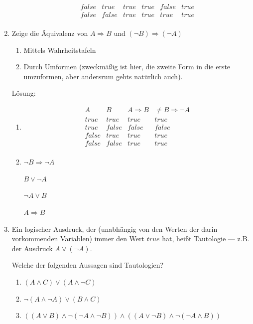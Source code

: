 \documentclass[../main.tex]{subfiles}
\begin{document}
\begin{enumerate}
\begin{enumerate}
\[\begin{array}{cccccc}
				            false & true  & true             & true   & false  & true               \\
				            false & false & true             & true   & true   & true               \\
			            \end{array}
		            \]
	      \end{enumerate}
	\item Zeige die Äquivalenz von \( A \Rightarrow B \) und \( (\neg B) \Rightarrow (\neg A) \)
	      \begin{enumerate}
		      \item Mittels Wahrheitstafeln
		      \item Durch Umformen (zweckmäßig ist hier, die zweite Form in die erste umzuformen,
		            aber andersrum gehts natürlich auch).
	      \end{enumerate}

	      Lösung:
	      \begin{enumerate}
		      \item \[
			            \begin{array}{cccc}
				            A     & B     & A \Rightarrow B & \neq B \Rightarrow \neg A \\
				            \hline
				            true  & true  & true            & true                      \\
				            true  & false & false           & false                     \\
				            false & true  & true            & true                      \\
				            false & false & true            & true                      \\
			            \end{array}
		            \]
		      \item \( \neg B \Rightarrow \neg A  \)

		            \( B \lor \neg A  \)

		            \( \neg A \lor B \)

		            \( A \Rightarrow B \)
	      \end{enumerate}
	\item Ein logischer Ausdruck, der (unabhängig von den Werten der darin vorkommenden Variablen)
	      immer den Wert \( true \) hat, heißt Tautologie — z.B. der Ausdruck \( A \lor (\neg A) \).

	      Welche der folgenden Aussagen sind Tautologien?
	      \begin{enumerate}
		      \item \( (A \land C) \lor (A \land \neg C) \)
		      \item \( \neg (A \land \neg A) \lor (B \land C) \)
		      \item \( ((A \lor B) \land \neg (\neg A \land \neg B)) \land
		            ((A \lor \neg B) \land \neg (\neg A \land B)) \)
	      \end{enumerate}


\end{enumerate}
\end{document}
